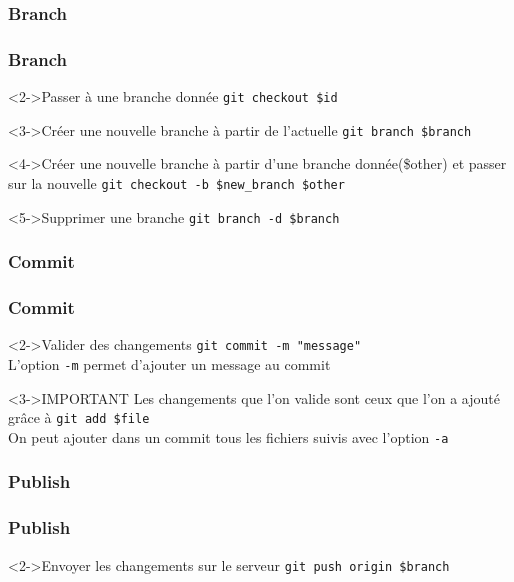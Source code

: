 	\subsubsection{Branch}
		\begin{frame}[fragile]
			\frametitle{Branch}
			\begin{block}<2->{Passer à une branche donnée}
				\verb'git checkout $id'
			\end{block}
			\begin{block}<3->{Créer une nouvelle branche à partir de l'actuelle}
				\verb'git branch $branch'
			\end{block}
			\begin{block}<4->{Créer une nouvelle branche à partir d'une branche donnée(\$other) et passer sur la nouvelle}
				\verb'git checkout -b $new_branch $other'
			\end{block}
			\begin{alertblock}<5->{Supprimer une branche}
				\verb'git branch -d $branch'
			\end{alertblock}

			
		\end{frame}
	\subsubsection{Commit}
		\begin{frame}[fragile]
			\frametitle{Commit}
			\begin{block}<2->{Valider des changements}
				\verb'git commit -m "message"'\\
				L'option \verb'-m' permet d'ajouter un message au commit				
			\end{block}
			\begin{alertblock}<3->{IMPORTANT}
				Les changements que l'on valide sont ceux que l'on a ajouté grâce à \verb'git add $file'\\
				On peut ajouter dans un commit tous les fichiers suivis avec l'option \verb'-a'
			\end{alertblock}
			
		\end{frame}
	\subsubsection{Publish}
		\begin{frame}[fragile]
			\frametitle{Publish}
			\begin{block}<2->{Envoyer les changements sur le serveur}
				\verb'git push origin $branch'\\	
			\end{block}
		\end{frame}

